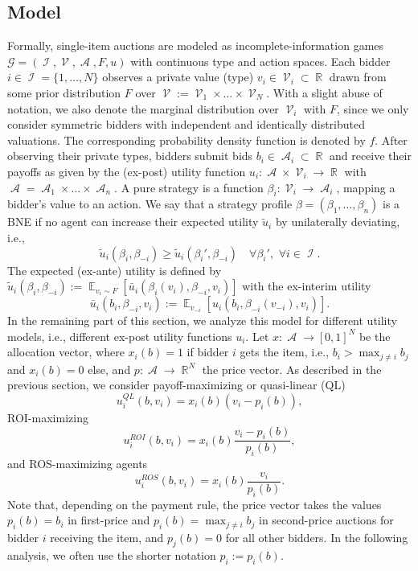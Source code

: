 \documentclass{article}
\DeclareMathOperator{\Acal}{\mathcal{A}}
\DeclareMathOperator{\Ical}{\mathcal{I}}
\DeclareMathOperator{\Vcal}{\mathcal{V}}
\DeclareMathOperator{\R}{\mathbb{R}}
\DeclareMathOperator{\E}{\mathbb{E}}
\begin{document}
\subsection{Model}
Formally, single-item auctions are modeled as incomplete-information games $ \mathcal G = (\Ical, \Vcal, \Acal, F, u)$ with continuous type and action spaces. Each bidder $ i \in \Ical = \{ 1,\dots,N\}$ observes a private value (type) $v_i \in \Vcal_i \subset \R $ drawn from some prior distribution $F$ over $\Vcal := \Vcal_1 \times \dots \times \Vcal_N$. With a slight abuse of notation, we also denote the marginal distribution over $\Vcal_i$ with $F$, since we only consider symmetric bidders with independent and identically distributed valuations. The corresponding probability density function is denoted by $f$. After observing their private types, bidders submit bids $b_i \in \Acal_i \subset \R$ and receive their payoffs as given by the (ex-post) utility function $u_i: \Acal \times \Vcal_i \rightarrow \R$ with $\Acal = \Acal_1 \times \dots \times \Acal_n$.
A pure strategy is a function $\beta_i: \Vcal_i \rightarrow \Acal_i$, mapping a bidder's value to an action. We say that a strategy profile $\beta = (\beta_1, \dots, \beta_n) $ is a BNE if no agent can increase their expected utility $ \tilde u_i $ by unilaterally deviating, i.e.,
\begin{equation}
	\tilde u_i(\beta_i, \beta_{-i}) \geq  \tilde u_i(\beta_i', \beta_{-i}) \quad \forall \beta_i',\,\, \forall i \in \Ical.
\end{equation}
The expected (ex-ante) utility is defined by $ \tilde u_i(\beta_i, \beta_{-i}) := \E_{v_i \sim F}[\bar u_i(\beta_i(v_i), \beta_{-i}, v_i)]$ with the ex-interim utility 
\begin{equation}
	\bar u_i(b_i, \beta_{-i}, v_i) := \E_{v_{-i}}[u_i(b_i,\beta_{-i}(v_{-i}), v_i)].
\end{equation}
In the remaining part of this section, we analyze this model for different utility models, i.e., different ex-post utility functions $u_i$. 
Let $x: \Acal \rightarrow [0, 1]^N$ be the allocation vector, where $x_i(b) = 1$ if bidder $i$ gets the item, i.e., $b_i > \max_{j \neq i} b_j$ and $x_i(b) = 0$ else, and $p: \Acal \rightarrow \R^N $ the price vector. 
As described in the previous section, we consider payoff-maximizing or quasi-linear (QL)
\begin{equation}
	u_i^{QL}(b, v_i) = x_i(b)(v_i - p_i(b)),
\end{equation}
ROI-maximizing
\begin{equation}
	u_i^{ROI}(b, v_i) = x_i(b) \dfrac{v_i - p_i(b)}{p_i(b)},
\end{equation}
and ROS-maximizing agents
\begin{equation}
	u_i^{ROS}(b, v_i) = x_i(b)\dfrac{v_i}{p_i(b)}.
\end{equation}
Note that, depending on the payment rule, the price vector takes the values $p_i(b) = b_i$ in first-price and $p_i(b) = \max_{j \neq i} b_j $ in second-price auctions for bidder $i$ receiving the item, and $p_j(b) = 0$ for all other bidders. In the following analysis, we often use the shorter notation $p_i := p_i(b)$.
\end{document}
